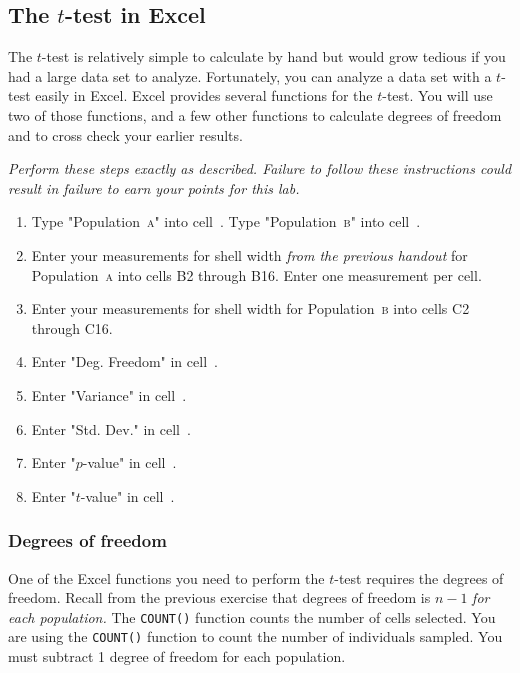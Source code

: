 \documentclass[12pt]{exam}
\newcommand*\Popa{Population~\textsc{a}}
\newcommand*\Popb{Population~\textsc{b}}
\newcommand*\xcell[1]{cell~\liningnum{#1}}
\begin{document}
\subsection*{The $t$-test in Excel}

The $t$-test is relatively simple to calculate by hand but would grow tedious if you had a large data set to analyze. Fortunately, you can analyze a data set with a $t$-test easily in Excel. Excel provides several functions for the $t$-test. You will use two of those functions, and a few other functions to calculate degrees of freedom and to cross check your earlier results.

\emph{Perform these steps exactly as described. Failure to follow these instructions could result in failure to earn your points for this lab.} 

\begin{enumerate}
	\item Type "\Popa" into \xcell{B1}. Type "\Popb" into \xcell{C1}.

	\item Enter your measurements for shell width \emph{from the previous handout} for \Popa{} into cells {\liningnum B2 through B16}. Enter one measurement per cell.
	
	\item Enter your measurements for shell width for \Popb{} into cells {\liningnum C2 through C16}.
	
	\item Enter "Deg. Freedom" in \xcell{A18}.

	\item Enter "Variance" in \xcell{A19}.
	
	\item Enter "Std. Dev." in \xcell{A20}.

	\item Enter "$p$-value" in \xcell{A21}.
	
	\item Enter "$t$-value" in \xcell{A22}.
	 
\end{enumerate}

\subsubsection*{Degrees of freedom}

One of the Excel functions you need to perform the $t$-test requires the degrees of freedom. Recall from the previous exercise that degrees of freedom is $n-1$ \emph{for each population.} The \texttt{COUNT()} function counts the number of cells selected. You are using the \texttt{COUNT()} function to count the number of individuals sampled. You must subtract 1 degree of freedom for each population.
\end{document}
